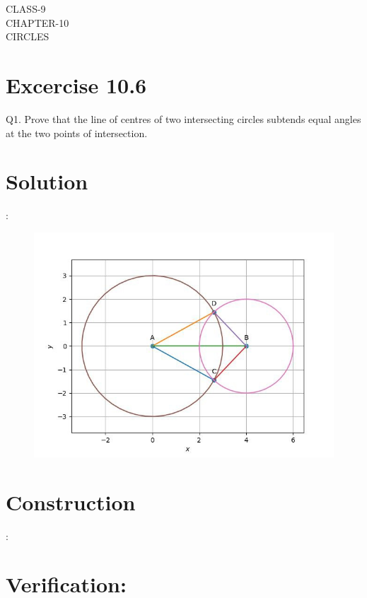 \documentclass[12pt]{article}
\begin{document}
\begin{center}
\textbf\large{CLASS-9\\CHAPTER-10 \\ CIRCLES}

\end{center}
\section*{Excercise 10.6}

Q1. Prove that the line of centres of two intersecting circles subtends equal angles at the two points of intersection.
\section*{\large Solution}:
\begin{figure}[h!]
\centering
\includegraphics[width=\columnwidth]{figs/circle3.png}
\caption{}
\label{fig:Fig1}
\end{figure}


\section*{\large Construction}:

\begin{table}[h!]
	\small
	\centering
     
	\label{table:table1}
\end{table}


\section*{\large Verification:}
\end{document}
